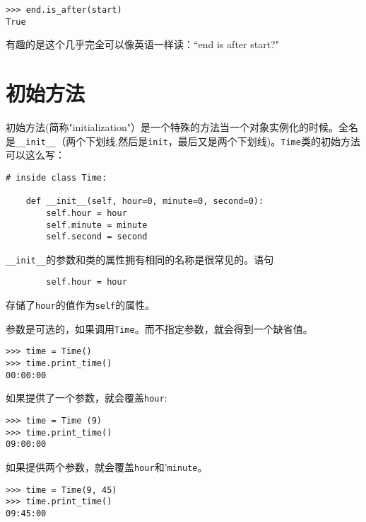 \beforeverb
\begin{verbatim}
>>> end.is_after(start)
True
\end{verbatim}
\afterverb

有趣的是这个几乎完全可以像英语一样读：“end is after start?"

\section{初始方法}


初始方法(简称"initialization"）是一个特殊的方法当一个对象实例化的时候。全名是\verb"__init__"（两个下划线,然后是{\tt init}，最后又是两个下划线)。{\tt Time}类的初始方法可以这么写：

\beforeverb
\begin{verbatim}
# inside class Time:

    def __init__(self, hour=0, minute=0, second=0):
        self.hour = hour
        self.minute = minute
        self.second = second
\end{verbatim}
\afterverb
%

\verb"__init__"的参数和类的属性拥有相同的名称是很常见的。语句

\beforeverb
\begin{verbatim}
        self.hour = hour
\end{verbatim}
\afterverb

存储了{\tt hour}的值作为{\tt self}的属性。


参数是可选的，如果调用{\tt Time}。而不指定参数，就会得到一个缺省值。

\beforeverb
\begin{verbatim}
>>> time = Time()
>>> time.print_time()
00:00:00
\end{verbatim}
\afterverb

如果提供了一个参数，就会覆盖{\tt hour}:

\beforeverb
\begin{verbatim}
>>> time = Time (9)
>>> time.print_time()
09:00:00
\end{verbatim}
\afterverb
%
如果提供两个参数，就会覆盖{\tt hour}和{'\tt minute}。

\beforeverb
\begin{verbatim}
>>> time = Time(9, 45)
>>> time.print_time()
09:45:00
\end{verbatim}
\afterverb


